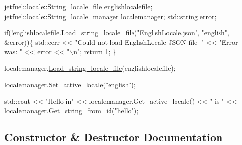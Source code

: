 \begin{DoxyCode}
\hyperlink{classjetfuel_1_1locale_1_1String__locale__file}{jetfuel::locale::String\_locale\_file} englishlocalefile;
\hyperlink{classjetfuel_1_1locale_1_1String__locale__manager}{jetfuel::locale::String\_locale\_manager} localemanager;
std::string error;

\textcolor{keywordflow}{if}(!englishlocalefile.\hyperlink{classjetfuel_1_1locale_1_1String__locale__file_a904609e7cde4eb624cb940cbba642ea0}{Load\_string\_locale\_file}(\textcolor{stringliteral}{"EnglishLocale.json"},
    \textcolor{stringliteral}{"english"}, &error))\{
    std::cerr << \textcolor{stringliteral}{"Could not load EnglishLocale JSON file! "} <<
    \textcolor{stringliteral}{"Error was: "} << error << \textcolor{stringliteral}{"\(\backslash\)n"};
    \textcolor{keywordflow}{return} 1;
\}

localemanager.\hyperlink{classjetfuel_1_1locale_1_1String__locale__manager_a2a972352f2b52a6aec947aad636ca6f1}{Load\_string\_locale\_file}(englishlocalefile);

localemanager.\hyperlink{classjetfuel_1_1locale_1_1String__locale__manager_a2bca626efc214510e533a8c4ece7cafb}{Set\_active\_locale}(\textcolor{stringliteral}{"english"});

std::cout << \textcolor{stringliteral}{"Hello in"} << localemanager.\hyperlink{classjetfuel_1_1locale_1_1String__locale__manager_a41b25b50b804bce31184b32e6dc97fae}{Get\_active\_locale}() <<  
            \textcolor{stringliteral}{" is "} << localemanager.\hyperlink{classjetfuel_1_1locale_1_1String__locale__manager_a215fa1aaf302e45b1ab375f764a8d101}{Get\_string\_from\_id}(\textcolor{stringliteral}{"hello"});
\end{DoxyCode}
 

\subsection{Constructor \& Destructor Documentation}
\mbox{\label{classjetfuel_1_1locale_1_1String__locale__manager_a347f49d477102a965dcbf288a79b403a}} 
